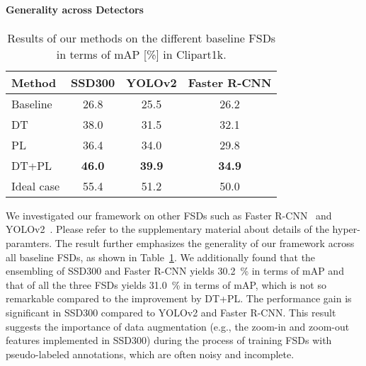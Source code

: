 \documentclass[10pt,twocolumn,letterpaper]{article}
\newcommand{\Tref}[1]{Table~\ref{#1}}
\newcommand{\datasetclipart}{Clipart1k}
\begin{document}
\paragraph{Generality across Detectors}
\begin{table}[t]
  \caption{Results of our methods on the different baseline FSDs in terms of mAP [\%] in \datasetclipart.}
  \label{tbl:comparison_of_detectors}
  \centering
  \begin{tabular}{@{}lccc@{}} \toprule
  	Method & SSD300 & YOLOv2 & Faster R-CNN \\ \midrule
	Baseline & 26.8 & 25.5 & 26.2\\
	DT & 38.0 & 31.5 & 32.1 \\
	PL & 36.4 & 34.0 & 29.8 \\
	DT+PL & \textbf{46.0} & \textbf{39.9} & \textbf{34.9} \\ \midrule
	Ideal case & 55.4 & 51.2 & 50.0\\ \bottomrule
  \end{tabular}
\end{table} We investigated our framework on other FSDs such as Faster R-CNN~\cite{ren2015faster} and YOLOv2~\cite{redmon2016yolo9000}.
Please refer to the supplementary material about details of the hyper-paramters.
The result further emphasizes the generality of our framework across all baseline FSDs, as shown in \Tref{tbl:comparison_of_detectors}.
We additionally found that the ensembling of SSD300 and Faster R-CNN yields 30.2~\% in terms of mAP and that of all the three FSDs yields 31.0~\% in terms of mAP, which is not so remarkable compared to the improvement by DT+PL.
The performance gain is significant in SSD300 compared to YOLOv2 and Faster R-CNN.
This result suggests the importance of data augmentation (e.g., the zoom-in and zoom-out features implemented in SSD300) during the process of training FSDs with pseudo-labeled annotations, which are often noisy and incomplete.
\end{document}
